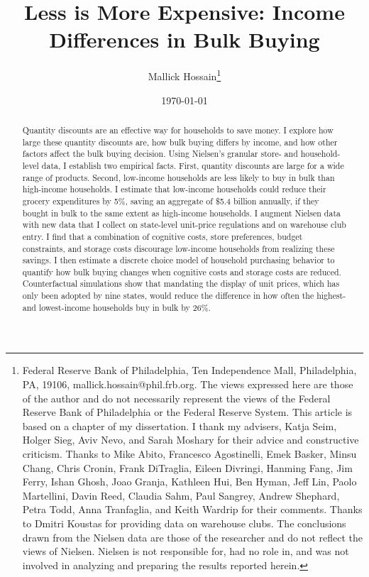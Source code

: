 \documentclass[AER]{AEA_mal}
\begin{document}
\title{Less is More Expensive: Income Differences in Bulk Buying}
\author{Mallick Hossain\thanks{%
Federal Reserve Bank of Philadelphia, Ten Independence Mall, Philadelphia, PA, 19106, mallick.hossain@phil.frb.org. The views expressed here are those of the author and do not necessarily represent the views of the Federal Reserve Bank of Philadelphia or the Federal Reserve System. This article is based on a chapter of my dissertation. I thank my advisers, Katja Seim, Holger Sieg, Aviv Nevo, and Sarah Moshary for their advice and constructive criticism. Thanks to Mike Abito, Francesco Agostinelli, Emek Basker, Minsu Chang, Chris Cronin, Frank DiTraglia, Eileen Divringi, Hanming Fang, Jim Ferry, Ishan Ghosh, Joao Granja, Kathleen Hui, Ben Hyman, Jeff Lin, Paolo Martellini, Davin Reed, Claudia Sahm, Paul Sangrey, Andrew Shephard, Petra Todd, Anna Tranfaglia, and Keith Wardrip for their comments. Thanks to Dmitri Koustas for providing data on warehouse clubs. The conclusions drawn from the Nielsen data are those of the researcher and do not reflect the views of Nielsen. Nielsen is not responsible for, had no role in, and was not involved in analyzing and preparing the results reported herein.}}
\date{\today}
\JEL{}
\Keywords{}

\begin{abstract}
\noindent Quantity discounts are an effective way for households to save money. I explore how large these quantity discounts are, how bulk buying differs by income, and how other factors affect the bulk buying decision. Using Nielsen's granular store- and household-level data, I establish two empirical facts. First, quantity discounts are large for a wide range of products. Second, low-income households are less likely to buy in bulk than high-income households. I estimate that low-income households could reduce their grocery expenditures by 5\%, saving an aggregate of \$5.4 billion annually, if they bought in bulk to the same extent as high-income households. I augment Nielsen data with new data that I collect on state-level unit-price regulations and on warehouse club entry. I find that a combination of cognitive costs, store preferences, budget constraints, and storage costs discourage low-income households from realizing these savings. I then estimate a discrete choice model of household purchasing behavior to quantify how bulk buying changes when cognitive costs and storage costs are reduced. Counterfactual simulations show that mandating the display of unit prices, which has only been adopted by nine states, would reduce the difference in how often the highest- and lowest-income households buy in bulk by 26\%.
\end{abstract}
\end{document}

